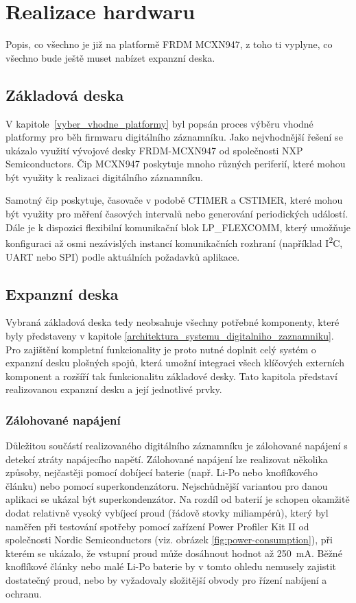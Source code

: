 
\chapter{Realizace hardwaru}
\label{realizace_hardwaru}
Popis, co všechno je již na platformě FRDM MCXN947, z toho ti vyplyne, co všechno bude ještě muset nabízet expanzní deska.

\section{Základová deska} 
V kapitole~\ref{vyber_vhodne_platformy} byl popsán proces výběru vhodné platformy pro běh firmwaru digitálního záznamníku. Jako nejvhodnější řešení se ukázalo využití vývojové desky FRDM-MCXN947 od společnosti NXP Semiconductors. Čip MCXN947 poskytuje mnoho různých periferií, které mohou být využity k realizaci digitálního záznamníku.

Samotný čip poskytuje, časovače v podobě CTIMER a CSTIMER, které mohou být využity pro měření časových intervalů nebo generování periodických událostí. Dále je k dispozici flexibilní komunikační blok LP\_FLEXCOMM, který umožňuje konfiguraci až osmi nezávislých instancí komunikačních rozhraní (například I\textsuperscript{2}C, UART nebo SPI) podle aktuálních požadavků aplikace.

\section{Expanzní deska}
Vybraná základová deska tedy neobsahuje všechny potřebné komponenty, které byly představeny v kapitole \ref{architektura_systemu_digitalniho_zaznamniku}. Pro zajištění kompletní funkcionality je proto nutné doplnit celý systém o expanzní desku plošných spojů, která umožní integraci všech klíčových externích komponent a rozšíří tak funkcionalitu základové desky. Tato kapitola představí realizovanou expanzní desku a její jednotlivé prvky.

\subsection{Zálohované napájení}
\label{zalohovane_napajeni_hw}
Důležitou součástí realizovaného digitálního záznamníku je zálohované napájení s detekcí ztráty napájecího napětí. Zálohované napájení lze realizovat několika způsoby, nejčastěji pomocí dobíjecí baterie (např. Li-Po nebo knoflíkového článku) nebo pomocí superkondenzátoru. Nejschůdnější variantou pro danou aplikaci se ukázal být superkondenzátor. Na rozdíl od baterií je schopen okamžitě dodat relativně vysoký vybíjecí proud (řádově stovky miliampérů), který byl naměřen při testování spotřeby pomocí zařízení Power Profiler Kit II od společnosti Nordic Semiconductors (viz. obrázek \ref{fig:power-consumption}), při kterém se ukázalo, že vstupní proud může dosáhnout hodnot až \SI{250}{\milli\ampere}. Běžné knoflíkové články nebo malé Li-Po baterie by v tomto ohledu nemusely zajistit dostatečný proud, nebo by vyžadovaly složitější obvody pro řízení nabíjení a ochranu. \cite{nordic_semi_ppk2}

